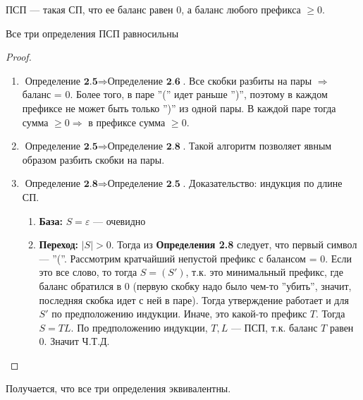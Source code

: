 \begin{definition}
    ПСП --- такая СП, что ее баланс равен 0, а баланс любого префикса $\ge 0$.
\end{definition}
\begin{proposition}
    Все три определения ПСП равносильны
\end{proposition}
\begin{proof}
\indent
    \begin{enumerate}
        \item $\textbf{Определение 2.5} \Rightarrow \textbf{Определение 2.6}$. Все скобки разбиты на пары $\Rightarrow$ баланс = 0. Более того, в паре ''('' идет раньше '')'', поэтому в каждом префиксе не может быть только '')'' из одной пары. В каждой паре тогда сумма $\ge 0 \Rightarrow$ в префиксе сумма $\ge 0$. 
        \item $\textbf{Определение 2.5} \Rightarrow \textbf{Определение 2.8}$. Такой алгоритм позволяет явным образом разбить скобки на пары.
        \item $\textbf{Определение 2.8} \Rightarrow \textbf{Определение 2.5}$. Доказательство: индукция по длине СП.
        \begin{enumerate}
            \item[] \textbf{База:} $S = \varepsilon$ --- очевидно 
            \item[] \textbf{Переход:} $|S| > 0$. Тогда из \textbf{Определения 2.8} следует, что первый символ --- ''(''. Рассмотрим кратчайший непустой префикс с балансом = 0. Если это все слово, то тогда $S = (S')$, т.к. это минимальный префикс, где баланс обратился в 0 (первую скобку надо было чем-то ''убить'', значит, последняя скобка идет с ней в паре). Тогда утверждение работает и для $S'$ по предположению индукции. Иначе, это какой-то префикс $T$. Тогда $S = TL$. По предположению индукции, $T, L$ --- ПСП, т.к. баланс $T$ равен 0. Значит Ч.Т.Д.
        \end{enumerate}
    \end{enumerate}
\end{proof}
Получается, что все три определения эквивалентны.